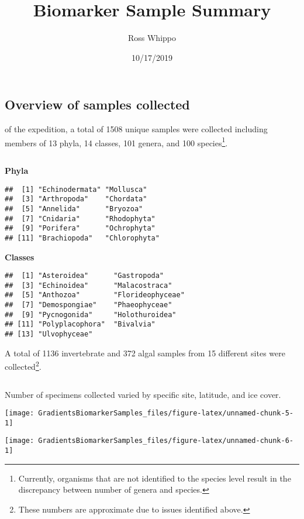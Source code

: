 \documentclass[]{tufte-handout}
\title{Biomarker Sample Summary}
\author{Ross Whippo}
\date{10/17/2019}
\begin{document}
\maketitle




\hypertarget{overview-of-samples-collected}{%
\subsection{Overview of samples
collected}\label{overview-of-samples-collected}}

 of the expedition, a total of 1508 unique
samples were collected including members of 13 phyla, 14 classes, 101
genera, and 100
species\footnote{Currently, organisms that are not identified to the species level result in the discrepancy between number of genera and species.}.

\(~\)

\textbf{Phyla}

\begin{verbatim}
##  [1] "Echinodermata" "Mollusca"     
##  [3] "Arthropoda"    "Chordata"     
##  [5] "Annelida"      "Bryozoa"      
##  [7] "Cnidaria"      "Rhodophyta"   
##  [9] "Porifera"      "Ochrophyta"   
## [11] "Brachiopoda"   "Chlorophyta"
\end{verbatim}

\textbf{Classes}

\begin{verbatim}
##  [1] "Asteroidea"      "Gastropoda"     
##  [3] "Echinoidea"      "Malacostraca"   
##  [5] "Anthozoa"        "Florideophyceae"
##  [7] "Demospongiae"    "Phaeophyceae"   
##  [9] "Pycnogonida"     "Holothuroidea"  
## [11] "Polyplacophora"  "Bivalvia"       
## [13] "Ulvophyceae"
\end{verbatim}

A total of 1136 invertebrate and 372 algal samples from 15 different
sites were
collected\footnote{These numbers are approximate due to issues identified above.}.

\(~\)

Number of specimens collected varied by specific site, latitude, and ice
cover.

\begin{marginfigure}
\texttt{[image: GradientsBiomarkerSamples\_files/figure-latex/unnamed-chunk-5-1]} \end{marginfigure}

\begin{marginfigure}
\texttt{[image: GradientsBiomarkerSamples\_files/figure-latex/unnamed-chunk-6-1]} \end{marginfigure}
\end{document}
